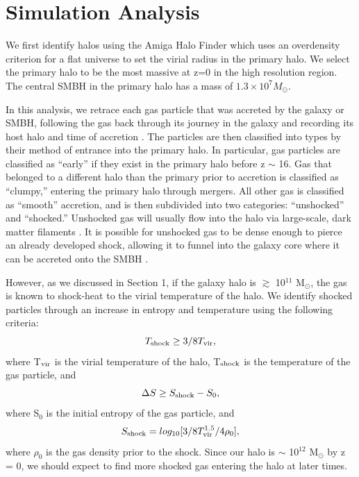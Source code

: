 \documentclass[]{emulateapj}
\begin{document}



\section{Simulation Analysis}\label{redux}

We first identify halos using the Amiga Halo Finder which uses an overdensity criterion for a flat universe \citep{Knebe2001,Knollmann2009,Gill2004} to set the virial radius in the primary halo. We select the primary halo to be the most massive at z=0 in the high resolution region. The central SMBH in the primary halo has a mass of $1.3 \times 10^{7} M_{\odot}$.  

In this analysis, we retrace each gas particle that was accreted by the galaxy or SMBH, following the gas back through its journey in the galaxy and recording its host halo and time of accretion \citep{Brooks2009}. The particles are then classified into types by their method of entrance into the primary halo. In particular, gas particles are classified as ``early'' if they exist in the primary halo before z $\sim$ 16. Gas that belonged to a different halo than the primary prior to accretion is classified as ``clumpy,'' entering the primary halo through mergers. All other gas is classified as ``smooth'' accretion, and is then subdivided into two categories: ``unshocked'' and ``shocked.'' Unshocked gas will usually flow into the halo via large-scale, dark matter filaments \citep{Keres2005,Bellovary2013}. It is possible for unshocked gas to be dense enough to pierce an already developed shock, allowing it to funnel into the galaxy core where it can be accreted onto the SMBH \citep{Nelson2013}.

However, as we discussed in Section 1, if the galaxy halo is $\gtrsim$ 10$^{11}$ M$_{\odot} $, the gas is known to shock-heat to the virial temperature of the halo. We identify shocked particles through an increase in entropy and temperature using the following criteria:
\begin{equation}
T_{\rm shock} \geq 3/8 T_{\rm vir},
\end{equation}
where T$_{\rm vir}$ is the virial temperature of the halo, T$_{\rm shock}$ is the temperature of the gas particle, and 
\begin{equation}
\Delta S \geq S_{\rm shock} - S_0,
\end{equation}
where S$_0$ is the initial entropy of the gas particle, and 
\begin{equation}
S_{\rm shock} = log_{10}[3/8 T_{\rm vir}^{1.5}/4 \rho_0],
\end{equation}
where $\rho_0$ is the gas density prior to the shock. Since our halo is $\sim$ 10$^{12}$ M$_{\odot} $ by z = 0, we should expect to find more shocked gas entering the halo at later times.
\end{document}
